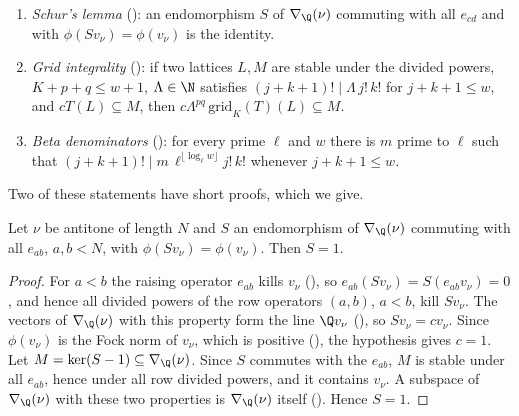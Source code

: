 \begin{enumerate}[label=(W\arabic*)]
projector on a highest weight vector): for $T$ killing the weight vectors of smaller first-block sum and a highest weight vector $v$ of
weight $\lambda$ with $\lambda_i\le\lambda_j+K$,
$\phi(\mathrm{grid}_K(T)v)\cdot z=\phi(Tv)$ with $z=\prod_{i<p\le j<p+q}(\lambda_i-\lambda_j+j-i)$.
\item\label{pf:sh-div:W:schur} \emph{Schur's lemma} (): an endomorphism $S$ of
$\nabla_\Q(\nu)$ commuting with all $e_{cd}$ and with $\phi(Sv_\nu)=\phi(v_\nu)$ is the identity.
\item\label{pf:sh-div:W:int} \emph{Grid integrality} (): if two lattices $L,M$ are
stable under the divided powers, $K+p+q\le w+1$, $\Lambda\in\N$ satisfies $(j+k+1)!\mid\Lambda\,j!\,k!$ for $j+k+1\le w$, and $cT(L)\subseteq M$,
then $c\Lambda^{pq}\,\mathrm{grid}_K(T)(L)\subseteq M$.
\item\label{pf:sh-div:W:beta} \emph{Beta denominators} (): for every prime $\ell$
and $w$ there is $m$ prime to $\ell$ such that $(j+k+1)!\mid m\,\ell^{\lfloor\log_\ell w\rfloor}j!\,k!$ whenever $j+k+1\le w$.
\end{enumerate}

Two of these statements have short proofs, which we give.

\begin{lemma}\label{pf:sh-div:schur}
Let $\nu$ be antitone of length $N$ and $S$ an endomorphism of $\nabla_\Q(\nu)$ commuting with all $e_{ab}$, $a,b<N$, with
$\phi(Sv_\nu)=\phi(v_\nu)$. Then $S=1$.
\end{lemma}

\begin{proof}
For $a<b$ the raising operator $e_{ab}$ kills $v_\nu$ (), so
$e_{ab}(Sv_\nu)=S(e_{ab}v_\nu)=0$, and hence all divided powers of the row operators $(a,b)$, $a<b$, kill $Sv_\nu$. The vectors of
$\nabla_\Q(\nu)$ with this property form the line $\Q v_\nu$ (), so $Sv_\nu=cv_\nu$.
Since $\phi(v_\nu)$ is the Fock norm of $v_\nu$, which is positive (), the
hypothesis gives $c=1$. Let $M=\ker(S-1)\subseteq\nabla_\Q(\nu)$. Since $S$ commutes with the $e_{ab}$, $M$ is stable under all $e_{ab}$,
hence under all row divided powers, and it contains $v_\nu$. A subspace of $\nabla_\Q(\nu)$ with these two properties is
$\nabla_\Q(\nu)$ itself (). Hence $S=1$.
\end{proof}

